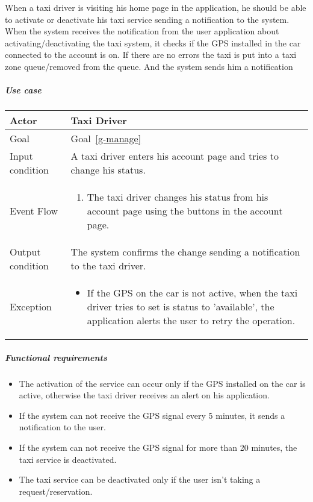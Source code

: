 When a taxi driver is visiting his home page in the application, he should be able to activate or deactivate his taxi service sending a notification to the system.
When the system receives the notification from the user application about activating/deactivating the taxi system, it checks if the GPS installed in the car connected to the account is on. If there are no errors the taxi is put into a taxi zone queue/removed from the queue. And the system sends him a notification

\subparagraph{Use case}
\noindent
    \begin{center}
        \begin{longtable}{| l | p{} |}
            \hline
            Actor & Taxi Driver \\
            \hline
            Goal & Goal~\ref{g-manage}
            \\
            \hline
            Input condition & A taxi driver enters his account page and tries to change his status. \\
            \hline
            Event Flow & 
                \begin{enumerate}
                	\item The taxi driver changes his status from his account page using the buttons in the account page.
            	\end{enumerate}
            \\
            \hline
            Output condition & The system confirms the change sending a notification to the taxi driver.\\
            \hline
            Exception & 
            \begin{itemize}
               \item If the GPS on the car is not active, when the taxi driver tries to set is status to 'available', the application alerts the user to retry the operation.
            \end{itemize} \\
            \hline
        \end{longtable}
    \end{center}

\subparagraph{Functional requirements}
\noindent
	\begin{itemize}
		\item The activation of the service can occur only if the GPS installed on the car is active, otherwise the taxi driver receives an alert on his application.
		\item If the system can not receive the GPS signal every 5 minutes, it sends a notification to the user.
		\item If the system can not receive the GPS signal for more than 20 minutes, the taxi service is deactivated.
		\item The taxi service can be deactivated only if the user isn't taking a request/reservation.
	\end{itemize} 
